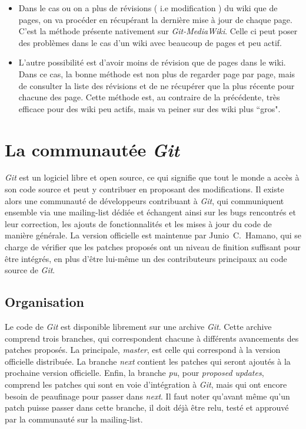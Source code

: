 \documentclass[11pt]{article}
\begin{document}
\begin{itemize}
\item Dans le cas ou on a plus de révisions ( i.e modification ) du wiki 
  que de pages, on va procéder en récupérant la dernière mise à jour de chaque
  page. C'est la méthode présente nativement sur \textit{Git-MediaWiki}. Celle
  ci peut poser des problèmes dans le cas d'un wiki avec beaucoup de pages et
  peu actif.\\
\item L'autre possibilité est d'avoir moins de révision que de pages dans le
  wiki. Dans ce cas, la bonne méthode est non plus de regarder page par page,
  mais de consulter la liste des révisions et de ne récupérer que la plus récente
  pour chacune des page. Cette méthode est, au contraire de la précédente, très
  efficace pour des wiki peu actifs, mais va peiner sur des wiki plus ``gros". 
\end{itemize}

\section{La communautée \textit{Git}}

\textit{Git} est un logiciel libre et open source, ce qui signifie que
tout le monde a accès à son code source et peut y contribuer en
proposant des modifications. Il existe alors une communauté de
développeurs contribuant à \textit{Git}, qui communiquent ensemble via
une mailing-list dédiée et échangent ainsi sur les bugs rencontrés et
leur correction, les ajouts de fonctionnalités et les mises à jour du
code de manière générale. La version officielle est maintenue par
Junio~C.~Hamano, qui se charge de vérifier que les patches proposés
ont un niveau de finition suffisant pour être intégrés, en plus d'être
lui-même un des contributeurs principaux au code source de \textit{Git}.

\subsection{Organisation}

Le code de \textit{Git} est disponible librement sur une archive
\textit{Git}. Cette archive comprend trois branches, qui correspondent
chacune à différents avancements des patches proposés. La principale,
\textit{master}, est celle qui correspond à la version officielle
distribuée. La branche \textit{next} contient les patches qui seront
ajoutés à la prochaine version officielle. Enfin, la branche
\textit{pu}, pour \textit{proposed updates}, comprend les patches qui
sont en voie d'intégration à \textit{Git}, mais qui ont encore besoin
de peaufinage pour passer dans \textit{next}. Il faut noter qu'avant
même qu'un patch puisse passer dans cette branche, il doit déjà être
relu, testé et approuvé par la communauté sur la mailing-list.
\end{document}
